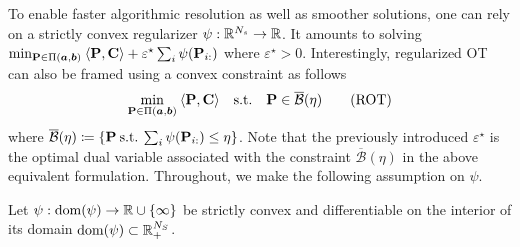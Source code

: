 To enable faster algorithmic resolution as well as smoother solutions, one can rely on a strictly convex regularizer $\psi : \mathbb{R}^{N_s} \to \mathbb{R}$. It amounts to solving $\min_{{\mathbf{P}} \in \Pi(\bm{a}, \bm{b})} \: \langle {\mathbf{P}}, \mathbf{C} \rangle + \varepsilon^\star \sum_i \psi({\mathbf{P}}_{i:})$ where $\varepsilon^\star > 0$. 
Interestingly, regularized OT can also be framed using a convex constraint as follows
\begin{align}\label{eq:cot}
    \min_{{\mathbf{P}} \in \Pi(\bm{a}, \bm{b})} \: \langle {\mathbf{P}}, {\mathbf{C}} \rangle \quad \text{s.t.} \quad  {\mathbf{P}} \in \overline{\mathcal{B}}(\eta)
    \tag{ROT}
\end{align}
where $\overline{\mathcal{B}}(\eta) \coloneqq \{ {\mathbf{P}} \: \text{s.t.} \: \sum_i \psi({\mathbf{P}}_{i:}) \leq \eta \}$. Note that the previously introduced $\varepsilon^\star$ is the optimal dual variable associated with the constraint $\overline{\mathcal{B}}(\eta)$ in the above equivalent formulation. 
Throughout, we make the following assumption on $\psi$.
\begin{assumption}\label{assumption_psi}
    Let $\psi: \mathrm{dom}(\psi) \to \mathbb{R} \cup \{\infty\}$ be strictly convex and differentiable on the interior of its domain $\mathrm{dom}(\psi) \subset \mathbb{R}^{N_S}_+$.
\end{assumption}

